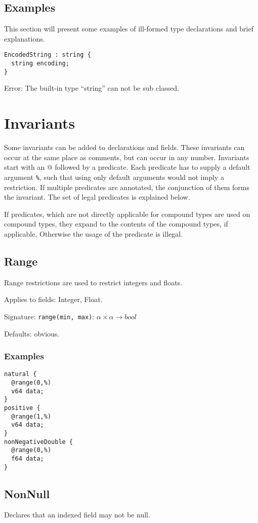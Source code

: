 \documentclass[a4paper,10pt]{article}
\begin{document}
\subsection{Examples}

This section will present some examples of ill-formed type declarations and brief explanations.

\begin{verbatim}
EncodedString : string {
  string encoding;
}
\end{verbatim}
Error: The built-in type ``string'' can not be sub classed.

\section{Invariants}
Some invariants can be added to declarations and fields. These invariants can occur at the same place as comments, but can occur in any number. Invariants start with an \textsc{@} followed by a predicate. Each predicate has to supply a default argument \texttt{\%}, such that using only default arguments would not imply a restriction.
If multiple predicates are annotated, the conjunction of them forms the invariant.
The set of legal predicates is explained below.

If predicates, which are not directly applicable for compound types are used on compound types, they expand to the contents of the compound types, if applicable. Otherwise the usage of the predicate is illegal.

\subsection*{Range}
Range restrictions are used to restrict integers and floats.

Applies to fields: Integer, Float.

Signature: \verb/range(min, max)/: $\alpha \times \alpha → bool$

Defaults: obvious.

\subsubsection*{Examples}
\begin{verbatim}
natural {
  @range(0,%)
  v64 data;
}
positive {
  @range(1,%)
  v64 data;
}
nonNegativeDouble {
  @range(0,%)
  f64 data;
}
\end{verbatim}

\subsection*{NonNull}
Declares that an indexed field may not be null.
\end{document}
